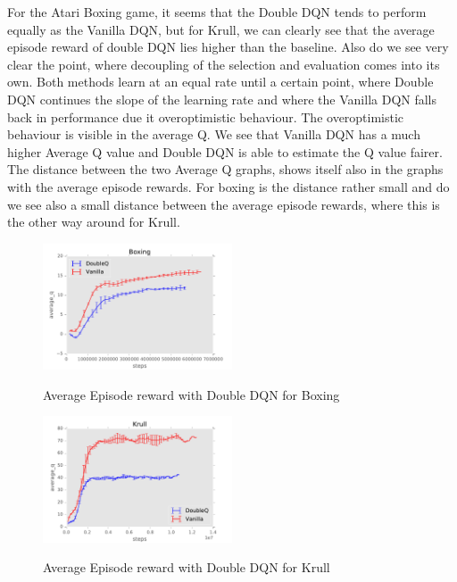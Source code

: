 \documentclass{sig-alternate}
\begin{document}
For the Atari Boxing game, it seems that the Double DQN tends to perform equally as the Vanilla DQN, but for Krull, we can clearly see that the average episode reward of double DQN lies higher than the baseline. Also do we see very clear the point, where decoupling of the selection and evaluation comes into its own. Both methods learn at an equal rate until a certain point, where Double DQN continues the slope of the learning rate and where the Vanilla DQN falls back in performance due it overoptimistic behaviour. The overoptimistic behaviour is visible in the average Q. We see that Vanilla DQN has a much higher Average Q value and Double DQN is able to estimate the Q value fairer. The distance between the two Average Q graphs, shows itself also in the graphs with the average episode rewards. For boxing is the distance rather small and do we see also a small distance between the average episode rewards, where this is the other way around for Krull.


\begin{figure}[h!]
    \centering
    \includegraphics[width=0.5\textwidth]{../results/Boxing/Comparisons/DoubleQ/DoubleQ-baseline-average_q.pdf}
    \label{boxing Double DQN}
    \caption{Average Episode reward with Double DQN for Boxing}
\end{figure}

\begin{figure}[h!]
    \centering
    \includegraphics[width=0.5\textwidth]{../results/Krull/Comparisons/DoubleQ/DoubleQ-baseline-average_q.pdf}
    \label{krull Double DQN}
    \caption{Average Episode reward with Double DQN for Krull}
\end{figure}
\end{document}
